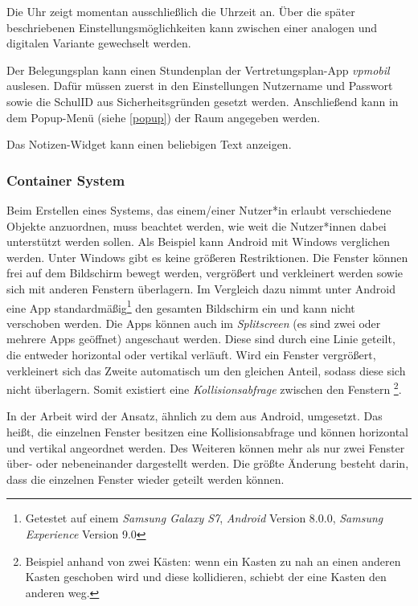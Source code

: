\documentclass[10pt]{article}
\begin{document}
Die Uhr zeigt momentan ausschließlich die Uhrzeit an. Über die später beschriebenen Einstellungsmöglichkeiten kann zwischen einer analogen und digitalen Variante gewechselt werden.

Der Belegungsplan kann einen Stundenplan der Vertretungsplan-App \textit{vpmobil} auslesen. Dafür müssen zuerst in den Einstellungen Nutzername und Passwort sowie die SchulID aus Sicherheitsgründen gesetzt werden. Anschließend kann in dem Popup-Menü (siehe \ref{popup}) der Raum angegeben werden.

Das Notizen-Widget kann einen beliebigen Text anzeigen.

\subsubsection{Container System}\label{Container System}
Beim Erstellen eines Systems, das einem/einer Nutzer*in erlaubt verschiedene Objekte anzuordnen, muss beachtet werden, wie weit die Nutzer*innen dabei unterstützt werden sollen. 
Als Beispiel kann Android mit Windows verglichen werden. Unter Windows gibt es keine größeren Restriktionen. Die Fenster können frei auf dem Bildschirm bewegt werden, vergrößert und verkleinert werden sowie sich mit anderen Fenstern überlagern. Im Vergleich dazu nimmt unter Android eine App standardmäßig\footnote{Getestet auf einem \textit{Samsung Galaxy S7}, \textit{Android} Version 8.0.0, \textit{Samsung Experience} Version 9.0} den gesamten Bildschirm ein und kann nicht verschoben werden. Die Apps können auch im \textit{Splitscreen} (es sind zwei oder mehrere Apps geöffnet) angeschaut werden. Diese sind durch eine Linie geteilt, die entweder horizontal oder vertikal verläuft. Wird ein Fenster vergrößert, verkleinert sich das Zweite automatisch um den gleichen Anteil, sodass diese sich nicht überlagern. Somit existiert eine \textit{Kollisionsabfrage} zwischen den Fenstern \footnote{Beispiel anhand von zwei Kästen: wenn ein Kasten zu nah an einen anderen Kasten geschoben wird und diese kollidieren, schiebt der eine Kasten den anderen weg.}.

In der Arbeit wird der Ansatz, ähnlich zu dem aus Android, umgesetzt. Das heißt, die einzelnen Fenster besitzen eine Kollisionsabfrage und können horizontal und vertikal angeordnet werden. Des Weiteren können mehr als nur zwei Fenster über- oder nebeneinander dargestellt werden. Die größte Änderung besteht darin, dass die einzelnen Fenster wieder geteilt werden können.
\end{document}
